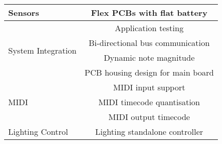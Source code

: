     \begin{tabular}{|l|c|}
        \hline
        Sensors                               & \cellcolor{orange!25}Flex PCBs with flat battery       \\ \hline \hline
        \multirow{4}{7em}{System Integration} & \cellcolor{orange!25}Application testing               \\ \cline{2-2}
        ~                                     & \cellcolor{orange!25}Bi-directional bus communication  \\ \cline{2-2}
        ~                                     & \cellcolor{orange!25}Dynamic note magnitude            \\ \cline{2-2}
        ~                                     & \cellcolor{orange!25}PCB housing design for main board \\ \hline \hline
        \multirow{3}{7em}{MIDI}               & \cellcolor{orange!25}MIDI input support                \\ \cline{2-2}
        ~                                     & \cellcolor{orange!25}MIDI timecode quantisation        \\ \cline{2-2}
        ~                                     & \cellcolor{orange!25}MIDI output timecode              \\ \hline \hline
        Lighting Control                      & \cellcolor{orange!25}Lighting standalone controller    \\ \hline
    \end{tabular}
